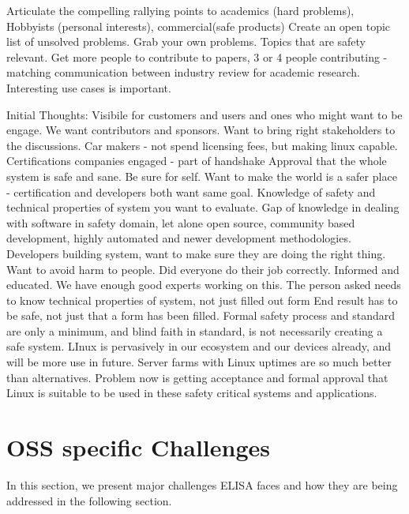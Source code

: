 \documentclass[12pt]{ElisaPaper}
\begin{document}
Articulate the compelling rallying points to 
academics (hard problems), 
Hobbyists (personal interests),
commercial(safe products)    
Create an open topic list of unsolved problems.  
Grab your own problems.   
 Topics that are safety relevant.    
 Get more people to contribute to papers,  3 or 4 people contributing - matching communication between industry review for academic research. 
Interesting use cases is important. 



Initial Thoughts:
Visibile for customers and users and ones who might want to be engage.   We want contributors and sponsors.
Want to bring right stakeholders to the discussions.
Car makers - not spend licensing fees, but making linux capable.
Certifications companies engaged - part of handshake
Approval that the whole system is safe and sane.   Be sure for self. 
Want to make the world is a safer place - certification and developers both want same goal.   Knowledge of safety and technical properties of system you want to evaluate.   Gap of knowledge in dealing with software in safety domain,  let alone open source, community based development,  highly automated and newer development methodologies.
Developers building system, want to make sure they are doing the right thing.   Want to avoid harm to people.   Did everyone do their job correctly.   Informed and educated.  We have enough good experts working on this.    
The person asked needs to know technical properties of system,  not just filled out form
End result has to be safe,  not just that a form has been filled.  Formal safety process and standard are only a minimum,  and blind faith in standard, is not necessarily creating a safe system.
LInux is pervasively in our ecosystem and our devices already,  and will be more use in future.   Server farms with Linux uptimes are so much better than alternatives.   
Problem now is getting acceptance and formal approval that Linux is suitable to be used in these safety critical systems and applications.  



\section{OSS specific Challenges}
\label{sec:OSS specific Challenges}
In this section, we present major challenges ELISA faces and how they are being addressed in the following section.
\end{document}
